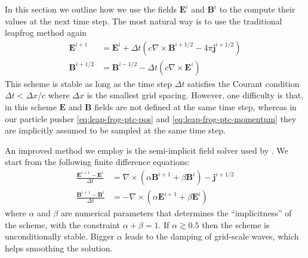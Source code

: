 In this section we outline how we use the fields $\mathbf{E}^{i}$ and
$\mathbf{B}^{i}$ to the compute their values at the next time step. The most
natural way is to use the traditional leapfrog method again
\begin{align}
  \label{eq:maxwell-leapfrog}
  \mathbf{E}^{i+1} &= \mathbf{E}^i + \Delta t (c\nabla\times \mathbf{B}^{i+1/2} - 4\pi \mathbf{j}^{i+1/2}) \\
  \mathbf{B}^{i+1/2} &= \mathbf{B}^{i-1/2} - \Delta t (c\nabla\times \mathbf{E}^i)
\end{align}
This scheme is stable as long as the time step $\Delta t$ satisfies the Courant
condition $\Delta t < \Delta x / c$ where $\Delta x$ is the smallest grid
spacing. However, one difficulty is that, in this scheme $\mathbf{E}$ and
$\mathbf{B}$ fields are not defined at the same time step, whereas in our
particle pusher \eqref{eq:leap-frog-ptc-pos} and
\eqref{eq:leap-frog-ptc-momentum} they are implicitly assumed to be sampled at
the same time step.

An improved method we employ is the semi-implicit field solver used by
\citep{haugboelle_photon-plasma:_2012}. We start from the following finite
difference equations:
\begin{align}
  \frac{\mathbf{E}^{i+1} -\mathbf{E}^{i}}{\Delta t} & = \nabla \times (
  \alpha \mathbf{B}^{i+1} + \beta \mathbf{B}^{i} ) -\mathbf{j}^{i+1/2}\\
  \frac{\mathbf{B}^{i+1} -\mathbf{B}^{i}}{\Delta t} & = - \nabla \times
  ( \alpha \mathbf{E}^{i+1} + \beta \mathbf{E}^{i} )
\end{align}
where $\alpha$ and $\beta$ are numerical parameters that determines
the ``implicitness'' of the scheme, with the constraint $\alpha +
\beta = 1$. If $\alpha \gtrsim 0.5$ then the scheme is unconditionally
stable. Bigger $\alpha$ leads to the damping of grid-scale waves,
which helps smoothing the solution.

